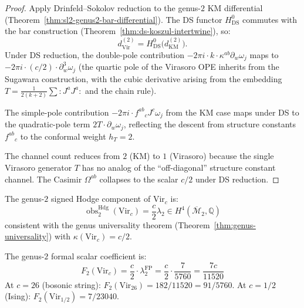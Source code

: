 \begin{proof}
Apply Drinfeld--Sokolov reduction to the genus-$2$ KM differential
(Theorem~\ref{thm:sl2-genus2-bar-differential}). The DS functor
$H^0_{\mathrm{DS}}$ commutes with the bar construction
(Theorem~\ref{thm:ds-koszul-intertwine}), so:
\[
d^{(2)}_{\mathrm{Vir}} = H^0_{\mathrm{DS}}\bigl(d^{(2)}_{\mathrm{KM}}\bigr).
\]
Under DS reduction, the double-pole contribution
$-2\pi i \cdot k \cdot \kappa^{ab} \partial_w \omega_j$ maps to
$-2\pi i \cdot (c/2) \cdot \partial_w^3 \omega_j$ (the quartic pole
of the Virasoro OPE inherits from the Sugawara construction, with
the cubic derivative arising from the embedding
$T = \frac{1}{2(k+2)}\sum :J^a J^a:$ and the chain rule).

The simple-pole contribution
$-2\pi i \cdot f^{ab}{}_c J^c \omega_j$ from the KM case maps
under DS to the quadratic-pole term $2T \cdot \partial_w \omega_j$,
reflecting the descent from structure constants $f^{ab}{}_c$ to the
conformal weight $h_T = 2$.

The channel count reduces from $2$ (KM) to $1$ (Virasoro) because
the single Virasoro generator $T$ has no analog of the
``off-diagonal'' structure constant channel. The Casimir
$\Omega^{ab}$ collapses to the scalar $c/2$ under DS reduction.
\end{proof}

\begin{corollary}
\label{cor:virasoro-genus2-curvature}
The genus-$2$ signed Hodge component of $\mathrm{Vir}_c$ is:
\begin{equation}\label{eq:vir-obs2}
\operatorname{obs}^{\mathrm{Hdg}}_2(\mathrm{Vir}_c)
= \frac{c}{2} \lambda_2
\in H^4(\overline{\mathcal{M}}_2, \mathbb{Q})
\end{equation}
consistent with the genus universality theorem
\textup{(}Theorem~\textup{\ref{thm:genus-universality})} with
$\kappa(\mathrm{Vir}_c) = c/2$.

The genus-$2$ formal scalar coefficient is:
\begin{equation}\label{eq:vir-F2}
F_2(\mathrm{Vir}_c) = \frac{c}{2} \cdot \lambda_2^{\mathrm{FP}}
= \frac{c}{2} \cdot \frac{7}{5760} = \frac{7c}{11520}
\end{equation}
At $c = 26$ \textup{(}bosonic string\textup{)}:
$F_2(\mathrm{Vir}_{26}) = 182/11520 = 91/5760$.
At $c = 1/2$ \textup{(}Ising\textup{)}:
$F_2(\mathrm{Vir}_{1/2}) = 7/23040$.
\end{corollary}


